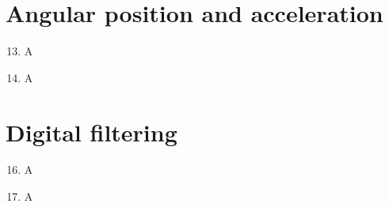 \documentclass[a4paper,12pt]{article}
\begin{document}
\newpage
\section{Angular position and acceleration}

\begin{enumerate}[label={\color{blue}\arabic*)}]
    \setcounter{enumi}{12}

    \item 
    A
    
    \item 
    A

\end{enumerate}

\newpage
\section{Digital filtering}

\begin{enumerate}[label={\color{blue}\arabic*)}]
    \setcounter{enumi}{15}

    \item 
    A
    
    \item 
    A

\end{enumerate}
\end{document}
